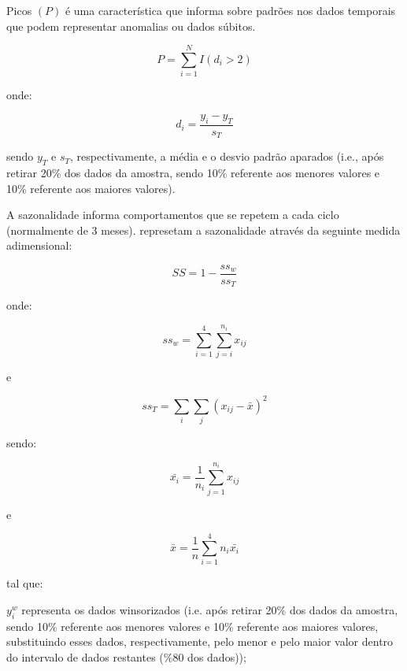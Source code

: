 \documentclass[11pt,letterpaper,twocolumn]{article}
\begin{document}
Picos $(P)$ é uma característica que informa sobre padrões nos dados temporais que podem representar anomalias ou dados súbitos.

\begin{equation}
P = \sum_{i=1}^{N}{I(d_i > 2)}
\end{equation}

onde:

\begin{equation}
d_i = \frac{y_i - y_{T}}{s_{T}}
\end{equation}

sendo $y_{T}$ e $s_{T}$, respectivamente, a média e o desvio padrão aparados (i.e., após retirar 20\% dos dados da amostra, sendo 10\% referente aos menores valores e 10\% referente aos maiores valores).

A sazonalidade informa comportamentos que se repetem a cada ciclo (normalmente de 3 meses). \cite{BusingerRead1999} represetam a sazonalidade através da seguinte medida adimensional:

\begin{equation}
SS = 1 - \frac{ss_{w}}{ss_{T}}
\end{equation}

onde:

\begin{equation}
ss_{w} = \sum_{i=1}^{4}\sum_{j=i}^{n_i}{x_{ij}}
\end{equation}

e

\begin{equation}
ss_{T} = \sum_{i}\sum_{j}{(x_{ij}-\bar{x})^2}
\end{equation}

sendo:

\begin{equation}
\bar{x_i} = \frac{1}{n_i} \sum_{j=1}^{n_i}{x_{ij}}
\end{equation}

e

\begin{equation}
\bar{x} = \frac{1}{n} \sum_{i=1}^{4}{n_i \bar{x_i}}
\end{equation}

tal que: 

$y_{i}^w$ representa os dados winsorizados (i.e. após retirar 20\% dos dados da amostra, sendo 10\% referente aos menores valores e 10\% referente aos maiores valores, substituindo esses dados, respectivamente, pelo menor e pelo maior valor dentro do intervalo de dados restantes (\%80 dos dados)); 
\end{document}

